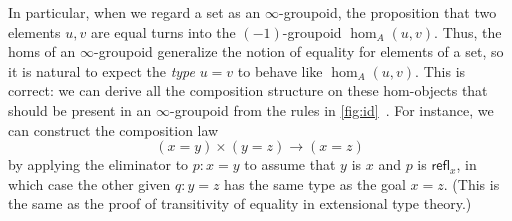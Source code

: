 \documentclass[10pt]{article}
\def\oo{\ensuremath{\infty}}
\def\io{\ensuremath{(\oo,1)}}
\def\refl{\mathsf{refl}}
\def\types{\vdash}
\numberwithin{equation}{section}
\begin{document}



In particular, when we regard a set as an \oo-groupoid, the proposition that two elements $u,v$ are equal turns into the $(-1)$-groupoid $\hom_A(u,v)$.
Thus, the homs of an \oo-groupoid generalize the notion of equality for elements of a set, so it is natural to expect the \emph{type} $u=v$ to behave like $\hom_A(u,v)$.
This is correct: we can derive all the composition structure on these hom-objects that should be present in an \oo-groupoid %
from the rules in \cref{fig:id}~\cite{pll:wkom-type,bg:type-wkom}.
For instance, we can construct the composition law
\[ (x=y) \times (y=z) \to (x=z) \]
by applying the eliminator to $p:x=y$ to assume that $y$ is $x$ and $p$ is $\refl_x$, in which case the other given $q:y=z$ has the same type as the goal $x=z$. %
(This is the same as the proof of transitivity of equality in extensional type theory.)
\end{document}

